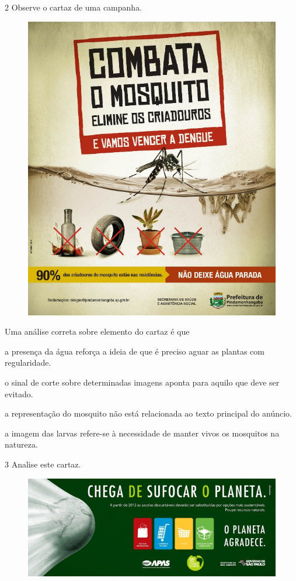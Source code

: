 \num{2} Observe o cartaz de uma campanha.


\begin{figure}[htpb!]
\centering
\includegraphics[width=.7\textwidth]{./media/image13.jpeg}
\end{figure}

Uma análise correta sobre elemento do cartaz é que

\begin{escolha}[itemsep=-5pt]
\item a presença da água reforça a ideia de que é preciso aguar as plantas com regularidade.

\item o sinal de corte sobre determinadas imagens aponta para aquilo que deve ser evitado.

\item a representação do mosquito não está relacionada ao texto principal do anúncio.

\item a imagem das larvas refere-se à necessidade de manter vivos os mosquitos na natureza.
\end{escolha}
\pagebreak

\num{3} Analise este cartaz.


\begin{figure}[htpb!]
\includegraphics[width=\textwidth]{./media/image14.jpeg}
\end{figure}

